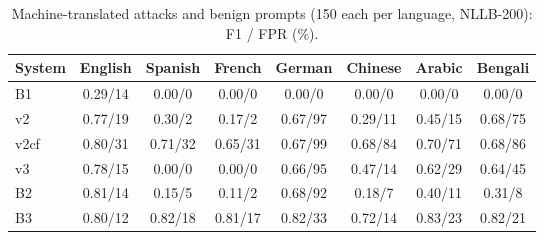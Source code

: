 \begin{table}[t]
\centering
\caption{Machine-translated attacks and benign prompts (150 each per language, NLLB-200): F1 / FPR (\%).}
\label{tab:multi}
\small
\begin{tabular}{lccccccc}
\toprule
\textbf{System} & \textbf{English} & \textbf{Spanish} & \textbf{French} & \textbf{German} & \textbf{Chinese} & \textbf{Arabic} & \textbf{Bengali} \\
\midrule
B1 & 0.29/14 & 0.00/0 & 0.00/0 & 0.00/0 & 0.00/0 & 0.00/0 & 0.00/0 \\
v2 & 0.77/19 & 0.30/2 & 0.17/2 & 0.67/97 & 0.29/11 & 0.45/15 & 0.68/75 \\
v2cf & 0.80/31 & 0.71/32 & 0.65/31 & 0.67/99 & 0.68/84 & 0.70/71 & 0.68/86 \\
v3 & 0.78/15 & 0.00/0 & 0.00/0 & 0.66/95 & 0.47/14 & 0.62/29 & 0.64/45 \\
B2 & 0.81/14 & 0.15/5 & 0.11/2 & 0.68/92 & 0.18/7 & 0.40/11 & 0.31/8 \\
B3 & 0.80/12 & 0.82/18 & 0.81/17 & 0.82/33 & 0.72/14 & 0.83/23 & 0.82/21 \\
\bottomrule
\end{tabular}
\end{table}
